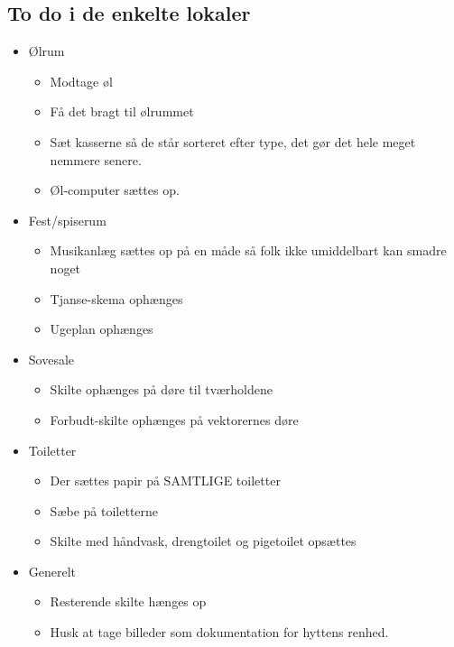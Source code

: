 \subsection{To do i de enkelte lokaler}
\begin{itemize}
\item Ølrum
	\begin{itemize}
	\item Modtage øl
	\item Få det bragt til ølrummet
	\item Sæt kasserne så de står sorteret efter type, det gør det hele meget nemmere senere.
	\item Øl-computer sættes op.
	\end{itemize}
\item Fest/spiserum	
	\begin{itemize}
	\item Musikanlæg sættes op på en måde så folk ikke umiddelbart kan smadre noget
	\item Tjanse-skema ophænges
	\item Ugeplan ophænges
	\end{itemize}
\item Sovesale
	\begin{itemize}
	\item Skilte ophænges på døre til tværholdene
	\item Forbudt-skilte ophænges på vektorernes døre
	\end{itemize}
\item Toiletter
	\begin{itemize}
	\item Der sættes papir på SAMTLIGE toiletter
	\item Sæbe på toiletterne
	\item Skilte med håndvask, drengtoilet og pigetoilet opsættes
	\end{itemize}
\item Generelt
	\begin{itemize}
	\item Resterende skilte hænges op
	\item Husk at tage billeder som dokumentation for hyttens renhed.
	\end{itemize}
\end{itemize}


